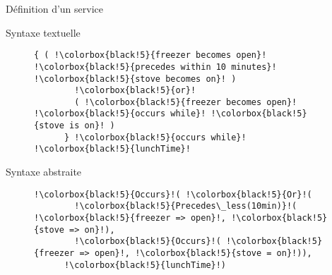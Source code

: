 \begin{frame}[fragile]{Définition d'un service}
  \begin{coloredbox}[black]{Syntaxe textuelle}
  \begin{figure}[h]
    \begin{lstlisting}[language=MaloyaText,basicstyle=\ttfamily\footnotesize,escapechar=!]
      { ( !\colorbox{black!5}{freezer becomes open}! !\colorbox{black!5}{precedes within 10 minutes}! !\colorbox{black!5}{stove becomes on}! )
        !\colorbox{black!5}{or}!
        ( !\colorbox{black!5}{freezer becomes open}! !\colorbox{black!5}{occurs while}! !\colorbox{black!5}{stove is on}! ) 
      } !\colorbox{black!5}{occurs while}! !\colorbox{black!5}{lunchTime}!
    \end{lstlisting}
  \end{figure}
\end{coloredbox}
 \begin{coloredbox}[black]{Syntaxe abstraite}
  \begin{figure}[!h]
    \begin{lstlisting}[language=Maloya,basicstyle=\ttfamily\footnotesize,escapechar=!]
      !\colorbox{black!5}{Occurs}!( !\colorbox{black!5}{Or}!(
        !\colorbox{black!5}{Precedes\_less(10min)}!( !\colorbox{black!5}{freezer => open}!, !\colorbox{black!5}{stove => on}!),
        !\colorbox{black!5}{Occurs}!( !\colorbox{black!5}{freezer => open}!, !\colorbox{black!5}{stove = on}!)),
      !\colorbox{black!5}{lunchTime}!)
    \end{lstlisting}
  \end{figure}
\end{coloredbox}
\end{frame}

